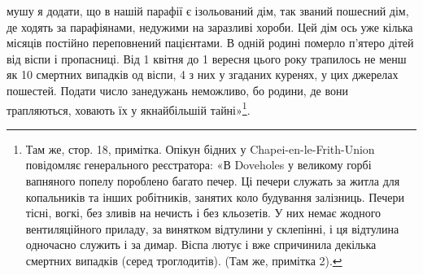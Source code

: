 мушу я додати, що в нашій парафії є ізольований дім, так
званий пошесний дім, де ходять за парафіянами, недужими на
заразливі хороби. Цей дім ось уже кілька місяців постійно переповнений
пацієнтами. В одній родині померло п’ятеро дітей від
віспи і пропасниці. Від 1 квітня до 1 вересня цього року трапилось
не менш як 10 смертних випадків од віспи, 4 з них у згаданих
куренях, у цих джерелах пошестей. Подати число занедужань
неможливо, бо родини, де вони трапляються, ховають їх
у якнайбільшій тайні»\footnote{
Там же, стор. 18, примітка. Опікун бідних у Chapei-en-le-Frith-Union
повідомляє генерального реєстратора: «В Doveholes у великому
горбі вапняного попелу пороблено багато печер. Ці печери служать
за житла для копальників та інших робітників, занятих коло будування
залізниць. Печери тісні, вогкі, без зливів на нечисть і без кльозетів.
У них немає жодного вентиляційного приладу, за винятком відтулини у
склепінні, і ця відтулина одночасно служить і за димар. Віспа лютує і
вже спричинила декілька смертних випадків (серед троглодитів). (Там же,
примітка 2).
}.

